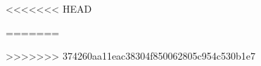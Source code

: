 \usepackage{graphicx}
\usepackage{tabularx}
\usepackage{amsmath} 
\usepackage{amssymb}
\usepackage{multicol}
\usepackage{lipsum}
\usepackage{setspace}
\usepackage{LSP/lsp-styles/jambox}
\usepackage{multirow}
\usepackage{hhline}
\usepackage{placeins}
\usepackage[normalem]{ulem}
<<<<<<< HEAD
\usepackage{langsci/styles/langsci-gb4e} 
=======
\usepackage{LSP/lsp-styles/lsp-gb4e} 
>>>>>>> 374260aa11eac38304f850062805c954c530b1e7




